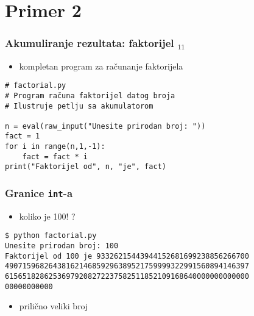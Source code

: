\documentclass[utf8,compress]{beamer}
\begin{document}


\section{Primer 2}


\begin{frame}[fragile]
  \frametitle{Akumuliranje rezultata: faktorijel $_{11}$}
  \begin{itemize}
    \item kompletan program za računanje faktorijela
  \end{itemize}
\begin{verbatim}
# factorial.py
# Program računa faktorijel datog broja
# Ilustruje petlju sa akumulatorom

n = eval(raw_input("Unesite prirodan broj: "))
fact = 1
for i in range(n,1,-1): 
    fact = fact * i
print("Faktorijel od", n, "je", fact)
\end{verbatim}
\end{frame}

\begin{frame}[fragile]
  \frametitle{Granice \texttt{int}-a}
  \begin{itemize}
    \item koliko je 100! ?
  \end{itemize}
\begin{verbatim}
$ python factorial.py
Unesite prirodan broj: 100
Faktorijel od 100 je 93326215443944152681699238856266700
49071596826438162146859296389521759999322991560894146397
61565182862536979208272237582511852109168640000000000000
00000000000
\end{verbatim}
  \begin{itemize}
    \item prilično veliki broj
  \end{itemize}
\end{frame}
\end{document}
